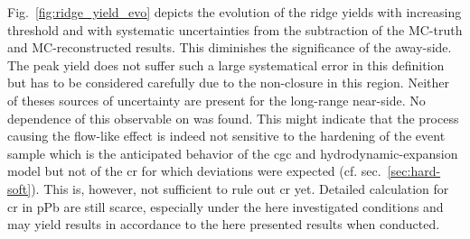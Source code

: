 Fig.~\ref{fig:ridge_yield_evo} depicts the evolution of the ridge yields with increasing threshold and with systematic uncertainties from the subtraction of the MC-truth and MC-reconstructed results. This diminishes the significance of the away-side. The peak yield does not suffer such a large systematical error in this definition but has to be considered carefully due to the non-closure in this region. Neither of theses sources of uncertainty are present for the long-range near-side. No dependence of this observable on \ptthresh was found. This might indicate that the process causing the flow-like effect is indeed not sensitive to the hardening of the event sample which is the anticipated behavior of the  \gls{cgc} and hydrodynamic-expansion model but not of the \gls{cr} for which deviations were expected (cf. sec.~\ref{sec:hard-soft}). This is, however, not sufficient to rule out \gls{cr} yet. Detailed calculation for \gls{cr} in \gls{pPb} are still scarce, especially under the here investigated conditions and may yield results in accordance to the here presented results when conducted.



